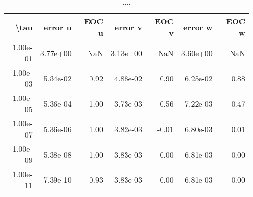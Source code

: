 \begin{table}[ht]
\centering
\begin{tabular}{rrrrrrr}
  \hline
  \textbf{\textbackslash{}tau} & \textbf{error u} & \textbf{EOC u} & \textbf{error v} & \textbf{EOC v} & \textbf{error w} & \textbf{EOC w} \\\hline
  1.00e-01 & 3.77e+00 & NaN & 3.13e+00 & NaN & 3.60e+00 & NaN \\
  1.00e-03 & 5.34e-02 & 0.92 & 4.88e-02 & 0.90 & 6.25e-02 & 0.88 \\
  1.00e-05 & 5.36e-04 & 1.00 & 3.73e-03 & 0.56 & 7.22e-03 & 0.47 \\
  1.00e-07 & 5.36e-06 & 1.00 & 3.82e-03 & -0.01 & 6.80e-03 & 0.01 \\
  1.00e-09 & 5.38e-08 & 1.00 & 3.83e-03 & -0.00 & 6.81e-03 & -0.00 \\
  1.00e-11 & 7.39e-10 & 0.93 & 3.83e-03 & 0.00 & 6.81e-03 & -0.00 \\\hline
\end{tabular}
\caption{....}
\end{table}
